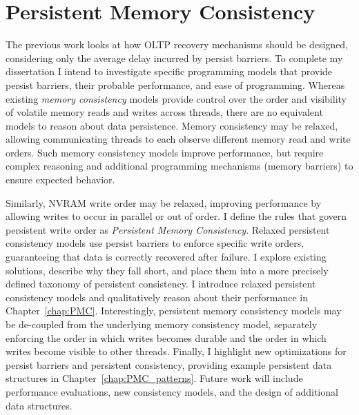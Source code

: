 \section{Persistent Memory Consistency}
\label{sec:Intro:PMC}

The previous work looks at how OLTP recovery mechanisms should be designed, considering only the average delay incurred by persist barriers.
To complete my dissertation I intend to investigate specific programming models that provide persist barriers, their probable performance, and ease of programming.
Whereas existing \emph{memory consistency} models provide control over the order and visibility of volatile memory reads and writes across threads, there are no equivalent models to reason about data persistence.
Memory consistency may be relaxed, allowing communicating threads to each observe different memory read and write orders.
Such memory consistency models improve performance, but require complex reasoning and additional programming mechanisms (memory barriers) to ensure expected behavior.

Similarly, NVRAM write order may be relaxed, improving performance by allowing writes to occur in parallel or out of order.
I define the rules that govern persistent write order as \emph{Persistent Memory Consistency}.
Relaxed persistent consistency models use persist barriers to enforce specific write orders, guaranteeing that data is correctly recovered after failure.
I explore existing solutions, describe why they fall short, and place them into a more precisely defined taxonomy of persistent consistency.
I introduce relaxed persistent consistency models and qualitatively reason about their performance in Chapter~\ref{chap:PMC}.
Interestingly, persistent memory consistency models may be de-coupled from the underlying memory consistency model, separately enforcing the order in which writes becomes durable and the order in which writes become visible to other threads.
Finally, I highlight new optimizations for persist barriers and persistent consistency, providing example persistent data structures in Chapter~\ref{chap:PMC_patterns}.
Future work will include performance evaluations, new consistency models, and the design of additional data structures.

